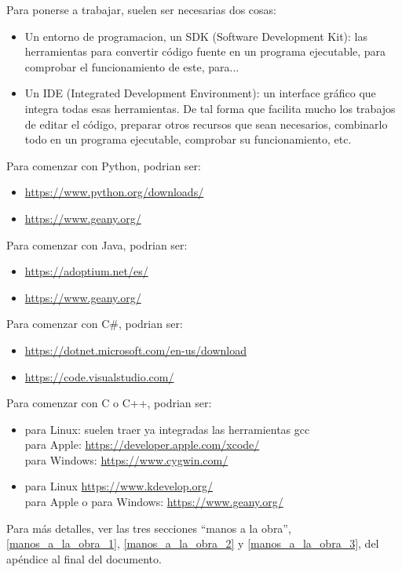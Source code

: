 \documentclass[spanish,12pt,a4paper,final,oneside]{book}
\begin{document}
Para ponerse a trabajar, suelen ser necesarias dos cosas:
\begin{itemize}
\item Un entorno de programacion, un SDK (Software Development Kit): las herramientas para convertir código fuente en un programa ejecutable, para comprobar el funcionamiento de este, para...
\item Un IDE (Integrated Development Environment): un interface gráfico que integra todas esas herramientas. De tal forma que facilita mucho los trabajos de editar el código, preparar otros recursos que sean necesarios, combinarlo todo en un programa ejecutable, comprobar su funcionamiento, etc. 
\end{itemize}

Para comenzar con Python, podrian ser:
\begin{itemize}
\item \url{https://www.python.org/downloads/}
\item \url{https://www.geany.org/}
\end{itemize}

Para comenzar con Java, podrian ser:
\begin{itemize}
\item \url{https://adoptium.net/es/}
\item \url{https://www.geany.org/}
\end{itemize}

Para comenzar con C\#, podrian ser:
\begin{itemize}
\item \url{https://dotnet.microsoft.com/en-us/download}
\item \url{https://code.visualstudio.com/}
\end{itemize}

Para comenzar con C o C++, podrian ser:
\begin{itemize}
\item para Linux: suelen traer ya integradas las herramientas gcc
\\para Apple: \url{https://developer.apple.com/xcode/}
\\para Windows: \url{https://www.cygwin.com/}
\item para Linux \url{https://www.kdevelop.org/}
\\para Apple o para Windows: \url{https://www.geany.org/}
\end{itemize}

Para más detalles, ver las tres secciones ``manos a la obra'', \ref{manos_a_la_obra_1}, \ref{manos_a_la_obra_2} y \ref{manos_a_la_obra_3}, del apéndice al final del documento. 
\end{document}
